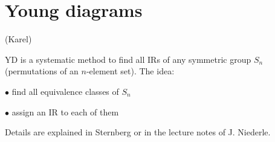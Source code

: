 \section{Young diagrams}

(Karel)

YD is a systematic method to find all IRs of any symmetric group $S_n$
(permutations of an $n$-element set). The idea:

$\bullet$ find all equivalence classes of $S_n$

$\bullet$ assign an IR to each of them

\noindent
Details are explained in Sternberg or in the lecture notes of J. Niederle. 





